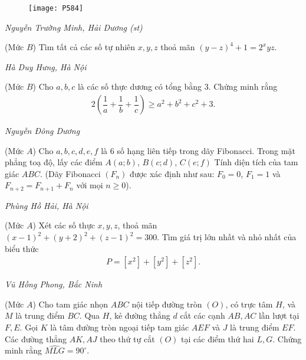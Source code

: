 \begin{multicols}{2}
\begin{figure}[H]
		\texttt{[image: P584]}
		\vspace*{-15pt}
	\end{figure}
	\begin{flushright}
		\textit{Nguyễn Trường Minh, Hải Dương (st)}
	\end{flushright}
	{}
	(Mức $B$) Tìm tất cả các số tự nhiên $x,y,z$ thoả mãn $(y-z)^4+1=2^x yz$. 
	\begin{flushright}
		\textit{Hà Duy Hưng, Hà Nội}
	\end{flushright}
	{}
	(Mức $B$) Cho $a,b,c$ là các số thực dương có tổng bằng $3$.  Chứng minh rằng 
	\begin{align*}
		2\left(\dfrac1a+\dfrac1b+\dfrac1c\right)\ge a^2+b^2+c^2+3.
	\end{align*}
	\begin{flushright}
		\textit{Nguyễn Đông Dương}
	\end{flushright}
	{}
	(Mức $A$) Cho $a,b,c,d,e,f$ là $6$ số hạng liên tiếp trong dãy Fibonacci. Trong mặt phẳng toạ độ, lấy các điểm $A(a;b)$, $B(c;d)$, $C(e;f)$
	Tính diện tích của tam giác $ABC$.
	\vskip 0.05cm
	(Dãy Fibonacci $(F_n)$ được xác định như sau: $F_0=0$, $F_1=1$ và $F_{n+2}=F_{n+1}+F_n$ với mọi $n\ge0$).
	\begin{flushright}
		\textit{Phùng Hồ Hải, Hà Nội}
	\end{flushright}
	\columnbreak
	{}
	(Mức $A$) Xét các số thực $x,y,z$, thoả mãn $(x-1)^2+(y+2)^2+(z-1)^2=300$. Tìm giá trị lớn nhất và nhỏ nhất của biểu thức 
	\begin{align*}
		P=[x^2]+[y^2]+[z^2].
	\end{align*}
	\begin{flushright}
		\textit{Vũ Hồng Phong, Bắc Ninh}
	\end{flushright}
	{}
	(Mức $A$) Cho tam giác nhọn $ABC$ nội tiếp đường tròn $(O)$, có trực tâm $H$, và $M$ là trung điểm $BC$. Qua $H$, kẻ đường thẳng $d$ cắt các cạnh $AB,AC$ lần lượt tại $F,E$. Gọi $K$ là tâm đường tròn ngoại tiếp tam giác $AEF$ và $J$ là trung điểm $EF$. Các đường thẳng $AK,AJ$ theo thứ tự cắt $(O)$ tại các điểm thứ hai $L,G$. Chứng minh rằng $\widehat{MLG}=90^\circ$. 
	\begin{figure}[H]
		\centering
		\vspace*{-5pt}
		\captionsetup{labelformat= empty, justification=centering}

\end{figure}
\end{multicols}
